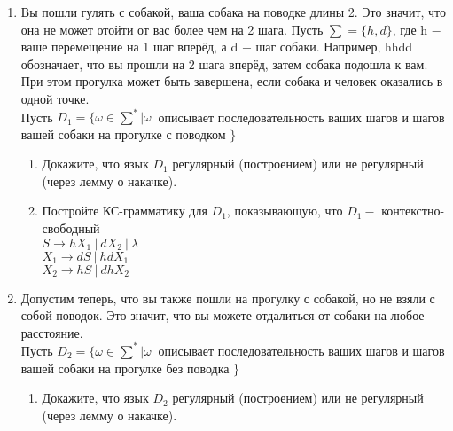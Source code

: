 \documentclass{article}
\begin{document}
        \begin{enumerate}
            \LARGE
            \item Вы пошли гулять с собакой, ваша собака на поводке длины 2. Это значит, что она не может отойти от вас
            более чем на 2 шага. Пусть $\sum = \{ h,d \}$, где h $ - $ ваше перемещение на 1 шаг вперёд, а d $ - $ шаг
            собаки. Например, hhdd обозначает, что вы прошли на 2 шага вперёд, затем собака подошла к вам. При этом
            прогулка может быть завершена, если собака и человек оказались в одной точке. \\
            Пусть $D_1 = \{ \omega \in \sum^*|\omega \ $ описывает последовательность ваших шагов и шагов вашей
            собаки на прогулке с поводком $\}$
                \begin{enumerate}
                    \item Докажите, что язык $D_1$ регулярный (построением) или не регулярный (через лемму о накачке). \\
                        
                    \begin{center}
                    \end{center}
                        
                    \item Постройте КС-грамматику для $D_1$, показывающую, что $D_1 - $ контекстно-свободный \\
                    
                        $S \rightarrow hX_1 \ | \ dX_2 \ | \ \lambda$ \\
                        $X_1 \rightarrow dS \ | \ hdX_1$ \\
                        $X_2 \rightarrow hS \ | \ dhX_2$ \\
                \end{enumerate}
            \item Допустим теперь, что вы также пошли на прогулку с собакой, но не взяли с собой поводок. Это значит, что
            вы можете отдалиться от собаки на любое расстояние. \\
            Пусть $D_2 = \{ \omega \in \sum^* |\omega \ $ описывает последовательность ваших шагов и шагов вашей собаки на
            прогулке без поводка $\}$
                \begin{enumerate}
                    \item Докажите, что язык $D_2$ регулярный (построением) или не регулярный (через лемму о накачке). \\
                    

\end{enumerate}
\end{enumerate}
\end{document}
